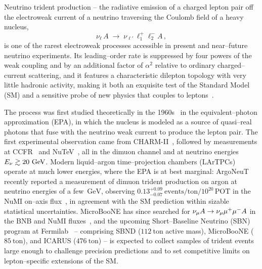 Neutrino trident production -- the radiative emission of a charged
lepton pair off the electroweak current of a neutrino traversing the
Coulomb field of a heavy nucleus,
\begin{equation}
  \nu_\ell\, A \;\longrightarrow\; \nu_{\ell'}\, \ell_1^+ \ell_2^- A\,,
\label{eq:trident-process}
\end{equation}
is one of the rarest electroweak processes accessible in present and
near--future neutrino experiments.  Its leading--order rate is
suppressed by four powers of the weak coupling and by an additional
factor of $\alpha^2$ relative to ordinary charged--current scattering,
and it features a characteristic dilepton topology with very little
hadronic activity, making it both an exquisite test of the
Standard Model (SM) and a sensitive probe of new physics that couples
to leptons~\cite{Altmannshofer:2014pba,Magill:2016hgc,
Ballett:2018uuc,Altmannshofer:2019zhy,Zhou:2019vxt,Zhou:2019frk}.

The process was first studied theoretically in the
1960s~\cite{Czyz:1964zz,Lovseth:1971vv,Brown:1971qr,Belusevic:1987cw}
in the equivalent--photon approximation (EPA), in which the nucleus is
modeled as a source of quasi--real photons that fuse with the neutrino
weak current to produce the lepton pair.  The first experimental
observation came from CHARM-II~\cite{Geiregat:1990gz}, followed by
measurements at CCFR~\cite{Mishra:1991bv} and NuTeV~\cite{Adams:1999mn},
all in the dimuon channel and at neutrino energies $E_\nu \gtrsim
20~\text{GeV}$.  Modern liquid--argon time--projection chambers (LArTPCs)
operate at much lower energies, where the EPA is at best marginal:
ArgoNeuT recently reported a measurement of dimuon trident production
on argon at neutrino energies of a few~$\text{GeV}$, observing
$0.13^{+0.09}_{-0.07}~\text{events}/\text{ton}/10^{20}\,\text{POT}$ in
the NuMI on--axis flux~\cite{ArgoNeuT:2019ckq}, in agreement with the SM
prediction within sizable statistical uncertainties.  MicroBooNE has
since searched for $\nu_\mu A \to \nu_\mu \mu^+\mu^- A$ in the BNB and NuMI
fluxes~\cite{MicroBooNE-trident}, and the upcoming Short--Baseline
Neutrino (SBN) program at Fermilab~\cite{SBN-proposal} -- comprising
SBND ($112~\text{ton}$ active mass), MicroBooNE ($85~\text{ton}$), and
ICARUS ($476~\text{ton}$) -- is expected to collect samples of trident
events large enough to challenge precision predictions and to set
competitive limits on lepton--specific extensions of the SM.

